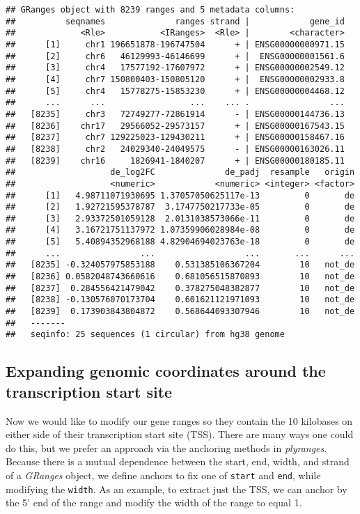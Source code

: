 \documentclass[
]{article}
\begin{document}
\begin{verbatim}
## GRanges object with 8239 ranges and 5 metadata columns:
##          seqnames              ranges strand |            gene_id
##             <Rle>           <IRanges>  <Rle> |        <character>
##      [1]     chr1 196651878-196747504      + | ENSG00000000971.15
##      [2]     chr6   46129993-46146699      + |  ENSG00000001561.6
##      [3]     chr4   17577192-17607972      + | ENSG00000002549.12
##      [4]     chr7 150800403-150805120      + |  ENSG00000002933.8
##      [5]     chr4   15778275-15853230      + | ENSG00000004468.12
##      ...      ...                 ...    ... .                ...
##   [8235]     chr3   72749277-72861914      - | ENSG00000144736.13
##   [8236]    chr17   29566052-29573157      + | ENSG00000167543.15
##   [8237]     chr7 129225023-129430211      + | ENSG00000158467.16
##   [8238]     chr2   24029340-24049575      - | ENSG00000163026.11
##   [8239]    chr16     1826941-1840207      + | ENSG00000180185.11
##                   de_log2FC              de_padj  resample   origin
##                   <numeric>            <numeric> <integer> <factor>
##      [1]   4.98711071930695 1.37057050625117e-13         0       de
##      [2]   1.92721595378787  3.1747750217733e-05         0       de
##      [3]   2.93372501059128  2.0131038573066e-11         0       de
##      [4]   3.16721751137972 1.07359906028984e-08         0       de
##      [5]   5.40894352968188 4.82904694023763e-18         0       de
##      ...                ...                  ...       ...      ...
##   [8235] -0.324057975853188    0.531385106367204        10   not_de
##   [8236] 0.0582048743660616    0.681056515870893        10   not_de
##   [8237]  0.284556421479042    0.378275048382877        10   not_de
##   [8238] -0.130576070173704    0.601621121971093        10   not_de
##   [8239]  0.173903843804872    0.568644093307946        10   not_de
##   -------
##   seqinfo: 25 sequences (1 circular) from hg38 genome
\end{verbatim}

\hypertarget{expanding-genomic-coordinates-around-the-transcription-start-site}{%
\subsection{Expanding genomic coordinates around the transcription start site}\label{expanding-genomic-coordinates-around-the-transcription-start-site}}

Now we would like to modify our gene ranges so they contain the 10 kilobases on
either side of their transcription start site (TSS). There are many ways one
could do this, but we prefer an approach via the anchoring methods in
\emph{plyranges}. Because there is a mutual dependence between the start, end,
width, and strand of a \emph{GRanges} object, we define anchors to fix one of
\texttt{start} and \texttt{end}, while modifying the \texttt{width}. As an example, to extract just
the TSS, we can anchor by the 5' end of the range and modify the width of the
range to equal 1.
\end{document}

